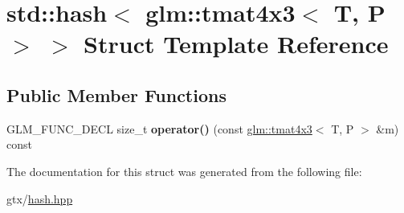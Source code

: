 \hypertarget{structstd_1_1hash_3_01glm_1_1tmat4x3_3_01T_00_01P_01_4_01_4}{\section{std\-:\-:hash$<$ glm\-:\-:tmat4x3$<$ T, P $>$ $>$ Struct Template Reference}
\label{structstd_1_1hash_3_01glm_1_1tmat4x3_3_01T_00_01P_01_4_01_4}
}
\subsection*{Public Member Functions}
\begin{DoxyCompactItemize}
\item 
\hypertarget{structstd_1_1hash_3_01glm_1_1tmat4x3_3_01T_00_01P_01_4_01_4_ac0396ee0e87774472983c43007161e81}{G\-L\-M\-\_\-\-F\-U\-N\-C\-\_\-\-D\-E\-C\-L size\-\_\-t {\bfseries operator()} (const \hyperlink{structglm_1_1tmat4x3}{glm\-::tmat4x3}$<$ T, P $>$ \&m) const }\label{structstd_1_1hash_3_01glm_1_1tmat4x3_3_01T_00_01P_01_4_01_4_ac0396ee0e87774472983c43007161e81}

\end{DoxyCompactItemize}


The documentation for this struct was generated from the following file\-:\begin{DoxyCompactItemize}
\item 
gtx/\hyperlink{hash_8hpp}{hash.\-hpp}\end{DoxyCompactItemize}
